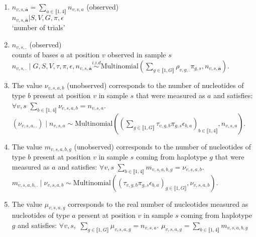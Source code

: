\documentclass{article}
\newcommand\indexsum[1]{\mathbf{\bar{#1}}}
\newcommand\countdetail{m}
\begin{document}
\begin{enumerate}
\begin{enumerate}
    \item $n_{v,s,\indexsum{a}}=\sum_{a\in\llbracket 1,4\rrbracket} n_{v,s,a}$ (observed)\\
    $n_{v,s,\indexsum{a}}|S,V, G,\pi,\epsilon$\\  
    `number of trials'


    
    \item$n_{v,s,.}$  (observed) \\counts of bases $a$ at position $v$ observed in sample $s$ \\
    $n_{v,s,.}\mid G,S,V,\tau,\pi,\epsilon,n_{v,s,\indexsum{a}}\overset{i.i.d}{\sim} \mathrm{Multinomial}\left(\sum_{g\in\llbracket 1,G\rrbracket} \rho_{v,g,.}\pi_{g,s},n_{v,s,\indexsum{a}}\right)$. 
    \item The value $\nu_{v,s,a,b}$ (unobserved) corresponds to the number of nucleotides of type $b$ present at position $v$ in sample $s$ that were measured as $a$ and satisfies: $\forall v,s$ $\sum_{b\in\llbracket 1,4\rrbracket}\nu_{v,s,a,b}=n_{v,s,a}$. 
    $(\nu_{v,s,a,.}) \mid n_{v,s,a} \sim \mathrm{Multinomial}\left(\left(\sum_{g\in\llbracket 1,G\rrbracket} \tau_{v,g,b} \pi_{g,s}\epsilon_{b,a}\right)_{b\in\llbracket 1,4\rrbracket},n_{v,s,a}\right).$
    \item The value $\countdetail_{v,s,a,b,g}$ (unobserved) corresponds to the number of nucleotides of type $b$ present at position $v$ in sample $s$ coming from haplotype $g$ that were measured as $a$ and satisfies: $\forall v,s$ $\sum_{b\in\llbracket 1,4\rrbracket}\countdetail_{v,s,a,b,g}=\nu_{v,s,a,b}$. 
    $\countdetail_{v,s,a,b,.} \mid \nu_{v,s,a,b} \sim \mathrm{Multinomial}\left(\left(\tau_{v,g,b} \pi_{g,s}\epsilon_{b,a}\right)_{g\in\llbracket 1,G\rrbracket},\nu_{v,s,a,b}\right).$
    
    \item The value $\mu_{v,s,a,g}$ corresponds to the real number of nucleotides  measured as nucleotides  of type $a$ present at position $v$ in sample $s$ coming from haplotype $g$ and satisfies: $\forall v,s,$  $\sum_{g\in\llbracket 1,G\rrbracket}\mu_{v,s,a,g}=n_{v,s,a}$. 
    $\mu_{v,s,a,g}= \sum_{b\in\llbracket 1,4\rrbracket}\countdetail_{v,s,a,b,g}$

\end{enumerate}
\end{enumerate}
\end{document}

